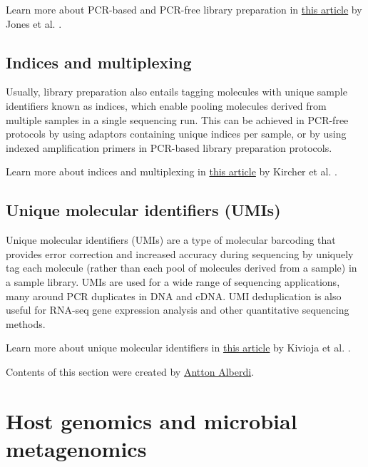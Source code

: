 \documentclass[
]{book}
\begin{document}
Learn more about PCR-based and PCR-free library preparation in \href{https://www.pnas.org/doi/abs/10.1073/pnas.1519288112}{this article} by Jones et al. \citep{Jones2015-bk}.

\hypertarget{indices-multiplexing}{%
\subsection*{Indices and multiplexing}\label{indices-multiplexing}}

Usually, library preparation also entails tagging molecules with unique sample identifiers known as indices, which enable pooling molecules derived from multiple samples in a single sequencing run. This can be achieved in PCR-free protocols by using adaptors containing unique indices per sample, or by using indexed amplification primers in PCR-based library preparation protocols.

Learn more about indices and multiplexing in \href{https://academic.oup.com/nar/article/40/1/e3/1287690}{this article} by Kircher et al. \citep{Kircher2012-vy}.

\hypertarget{unique-molecular-identifiers}{%
\subsection*{Unique molecular identifiers (UMIs)}\label{unique-molecular-identifiers}}

Unique molecular identifiers (UMIs) are a type of molecular barcoding that provides error correction and increased accuracy during sequencing by uniquely tag each molecule (rather than each pool of molecules derived from a sample) in a sample library. UMIs are used for a wide range of sequencing applications, many around PCR duplicates in DNA and cDNA. UMI deduplication is also useful for RNA-seq gene expression analysis and other quantitative sequencing methods.

Learn more about unique molecular identifiers in \href{https://www.nature.com/articles/nmeth.1778}{this article} by Kivioja et al. \citep{Kivioja2011-fe}.

Contents of this section were created by \protect\hyperlink{antton-alberdi}{Antton Alberdi}.

\hypertarget{library-meta-genomics}{%
\section{Host genomics and microbial metagenomics}\label{library-meta-genomics}}
\end{document}
